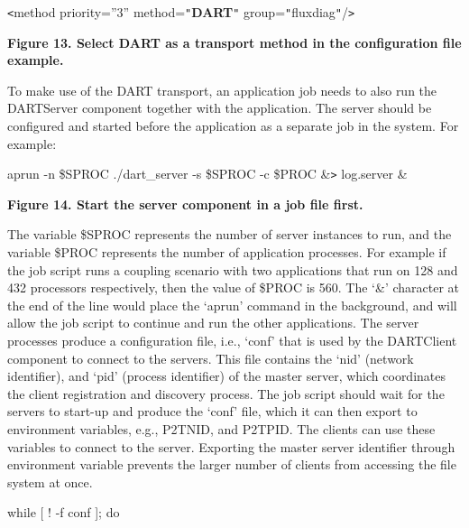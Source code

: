 \vspace{18pt}
\leftskip=18pt
\texttt{<}method priority=''3'' method=\texttt{"}\textbf{DART}\texttt{"} group=\texttt{"}fluxdiag\texttt{"}/\texttt{>}

\label{HToc144350172}

\vspace{18pt}
{\color{color20} \textbf{Figure 13. Select DART as a transport method in the configuration 
file example.}}

\vspace{6pt}
\leftskip=0pt
To make use of the DART transport, an application job needs to also run the DARTServer 
component together with the application. The server should be configured and started 
before the application as a separate job in the system. For example:

\vspace{18pt}
\leftskip=18pt
aprun  -n  \$SPROC ./dart\_server -s \$SPROC -c \$PROC \&\texttt{>} log.server 
\&

\label{HToc144350173}

\vspace{18pt}
{\color{color20} \textbf{Figure 14. Start the server component in a job file first.}}

\vspace{6pt}
\leftskip=0pt
The variable \$SPROC represents the number of server instances to run, and the 
variable \$PROC represents the number of application processes. For example if 
the job script runs a coupling scenario with two applications that run on 128 and 
432 processors respectively, then the value of \$PROC is 560. The `\&' character 
at the end of the line would place the `aprun' command in the background, and will 
allow the job script to continue and run the other applications. The server processes 
produce a configuration file, i.e., `conf' that is used by the DARTClient component 
to connect to the servers. This file contains the `nid' (network identifier), and 
`pid' (process identifier) of the master server, which coordinates the client registration 
and discovery process. The job script should wait for the servers to start-up and 
produce the `conf' file, which it can then export to environment variables, e.g., 
P2TNID, and P2TPID. The clients can use these variables to connect to the server. 
Exporting the master server identifier through environment variable prevents the 
larger number of clients from accessing the file system at once.

\vspace{18pt}
\leftskip=18pt
while [ ! -f conf ]; do

